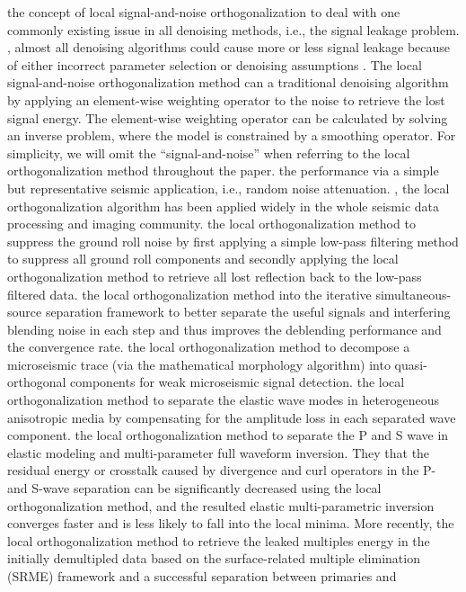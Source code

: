 \cite{yangkang2015ortho}  the concept of local signal-and-noise orthogonalization to deal with one commonly existing issue in all denoising methods, i.e., the signal leakage problem. , almost all denoising algorithms could cause more or less signal leakage because of either incorrect parameter selection or  denoising assumptions \cite[]{yangkang2015ortho}. The local signal-and-noise orthogonalization method can  a traditional denoising algorithm by applying an element-wise weighting operator to the noise to retrieve the lost signal energy. The element-wise weighting operator can be calculated by solving an inverse problem, where the model is constrained by a smoothing operator. For simplicity, we will omit the ``signal-and-noise'' when referring to the local orthogonalization method throughout the paper. \cite{yangkang2015ortho}  the performance via a simple but representative seismic application, i.e., random noise attenuation. , the local orthogonalization algorithm has been applied widely in the whole seismic data processing and imaging community. \cite{yangkang2015orthogroll}  the local orthogonalization method to suppress the ground roll noise by first applying a simple low-pass filtering method to suppress all ground roll components and secondly applying the local orthogonalization method to retrieve all lost reflection  back to the low-pass filtered data. \cite{yangkang2015dbortho}  the local orthogonalization method into the iterative simultaneous-source separation framework \cite[]{shaohuan2019} to better separate the useful signals and interfering blending noise in each step and thus improves the deblending performance and  the convergence rate. \cite{weilin2018}  the local orthogonalization method to decompose a microseismic trace (via the mathematical morphology algorithm) into quasi-orthogonal components for weak microseismic signal detection. \cite{sripanich2017elastic}  the local orthogonalization method to separate the elastic wave modes in heterogeneous anisotropic media by compensating for the amplitude loss in each separated wave component.  \cite{jeong2019enhanced}  the local orthogonalization method to separate the P and S wave  in elastic modeling and multi-parameter full waveform inversion. They  that the residual energy or crosstalk caused by divergence and curl operators in the P- and S-wave separation can be significantly decreased using the local orthogonalization method, and the resulted elastic multi-parametric inversion converges faster and is less likely to fall into the local minima. More recently, \cite{zhangdong2019ortho}  the local orthogonalization method to retrieve the leaked multiples energy in the initially demultipled data based on the surface-related multiple elimination (SRME) framework and  a successful separation between primaries and 